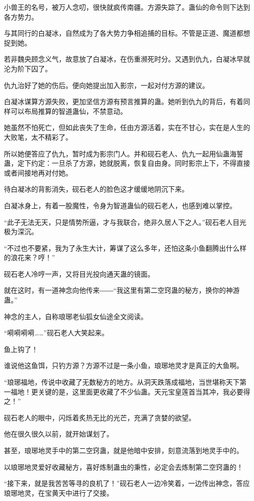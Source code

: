 \begin{this_body}
小兽王的名号，被万人念叨，很快就疯传南疆。方源失踪了。蛊仙的命令则下达到各方势力。

与其同行的白凝冰，自然成为了各大势力争相追捕的目标。不管是正道、魔道都想捉到她。

若非魏央顾念义气，故意放了白凝冰，在伤重濒死时分。又遇到仇九，白凝冰早就沦为阶下囚了。

仇九治好了她的伤后。便向她提出加入影宗，一起对付方源的建议。

白凝冰谋算方源失败，更加坚信方源有预言推算的蛊。她听到仇九的背后，有着同样可以布局推算的智道蛊仙，不禁意动。

她虽然不怕死亡，但如此丧失了生命，任由方源活着，实在不甘心，实在是人生的大败笔，太不精彩了。

所以她便答应了仇九，暂时成为影宗门人。并和砚石老人、仇九一起用仙蛊海誓蛊，定下约定：一旦杀了方源，她就脱离，恢复自由身。同时影宗上下，不得直接或者间接地再对付她。

待白凝冰的背影消失，砚石老人的脸色这才缓缓地阴沉下来。

白凝冰身上，有着一股魔性，令身为智道蛊仙的砚石老人，也感到难以掌控。

“此子无法无天，只是情势所逼，才与我联合，绝非久居人下之人。”砚石老人目光极为深沉。

“不过也不要紧，我为了永生大计，筹谋了这么多年，还怕这条小鱼翻腾出什么样的浪花来？哼！”

砚石老人冷哼一声，又将目光投向通天蛊的镜面。

就在这时，有一道神念向他传来――“我这里有第二空窍蛊的秘方，换你的神游蛊。”

神念的主人，自称琅琊老仙狐女仙途全文阅读。

“嗬嗬嗬嗬……”砚石老人大笑起来。

鱼上钩了！

谁说他这鱼饵，只钓方源？方源不过是一条小鱼，琅琊地灵才是真正的大鱼啊。

“琅琊福地，传说中收藏了无数秘方的地方。从洞天跌落成福地，当世堪称天下第一福地！更关键的是，这里面更收藏了不少仙蛊。天元宝皇莲首当其冲，我必要得之！”

砚石老人的眼中，闪烁着炙热无比的光芒，充满了贪婪的欲望。

他在很久很久以前，就开始谋划了。

甚至，琅琊地灵手中的第二空窍蛊，就是他暗中安排，刻意流落到地灵手中的。

以琅琊地灵爱好收藏秘方，喜好炼制蛊虫的秉性，必定会去炼制第二空窍蛊的！

“接下来，就是我苦苦等寻的良机了！”砚石老人一边冷笑着，一边传出神念，答应琅琊地灵，在宝黄天中进行了交接。


\end{this_body}

